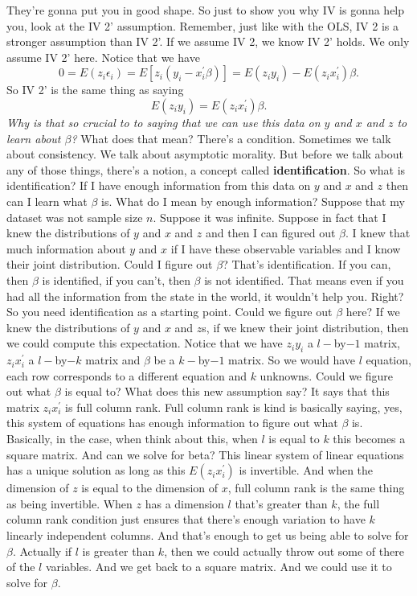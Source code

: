 \documentclass[11pt,a4paper]{amsart}
\theoremstyle{plain}
\theoremstyle{definition}
\begin{document}
 	 They're gonna put you in good shape. So just to show you why IV is gonna help you, look at the IV 2' assumption. Remember, just like with the OLS, IV 2 is a stronger assumption than IV 2'.  If we assume IV 2, we know IV 2' holds. We only assume IV 2' here. 
 	 Notice that we have
 	 \[	0 = E(z_{i}\epsilon_{i}) = E[z_{i}(y_{i}-x^{'}_{i} \beta)] = E(z_{i}y_{i}) - E(z_{i}x^{'}_{i}) \beta.	\] 
 	 So IV 2' is the same thing as saying 
 	 \[	E(z_{i}y_{i}) =  E(z_{i}x^{'}_{i}) \beta.	\] 
	\emph{Why is that so crucial to to saying that we can use this data on $y$ and $x$ and $z$ to learn about $\beta$?} What does that mean? There's a condition. Sometimes we talk about consistency. We talk about asymptotic morality. But before we talk about any of those things, there's a notion, a concept called \textbf{identification}. So what is identification? If I have enough information from this data on $y$ and $x$ and $z$ then can I learn what $\beta$ is. What do I mean by enough information? Suppose that my dataset was not sample size $n$. Suppose it was infinite. Suppose in fact that I knew the distributions of $y$ and $x$ and $z$ and then I can figured out $\beta$. I knew that much information about $y$ and $x$ if I have these observable variables and I know their joint distribution. Could I figure out $\beta$? That's identification. If you can, then $\beta$ is identified, if you can't, then $\beta$ is not identified. That means even if you had all the information from the state in the world, it wouldn't help you. Right? So you need identification as a starting point.  Could we figure out $\beta$ here? If we knew the distributions of $y$ and $x$ and $z$s, if we knew their joint distribution, then we could compute this expectation. Notice that we have $z_{i}y_{i}$ a $l-$by$-1$ matrix, $z_{i}x^{'}_{i}$ a $l-$by$-k$ matrix and $\beta$ be a $k-$by$-1$ matrix. So we would have $l$ equation, each row corresponds to a different equation and $k$ unknowns. Could we figure out what $\beta$ is equal to? What does this new assumption say? It says that this matrix $z_{i}x^{'}_{i}$ is full column rank. Full column rank is kind is basically saying, yes, this system of equations has enough information to figure out what $\beta$ is.  Basically, in the case, when think about this, when $l$ is equal to $k$ this becomes a square matrix. And can we solve for beta? This linear system of linear equations has a unique solution as long as this $E(z_{i}x^{'}_{i}) $ is invertible. And when the dimension of $z$ is equal to the dimension of $x$, full column rank is the same thing as being invertible. When $z$ has a dimension $l$ that's greater than $k$, the full column rank condition just ensures that there's enough variation to have $k$ linearly independent columns. And that's enough to get us being able to solve for $\beta$. Actually if $l$ is greater than $k$, then we could actually throw out some of there of the $l$ variables. And we get back to a square matrix. And we could use it to solve for $\beta$. \par 
\end{document}
